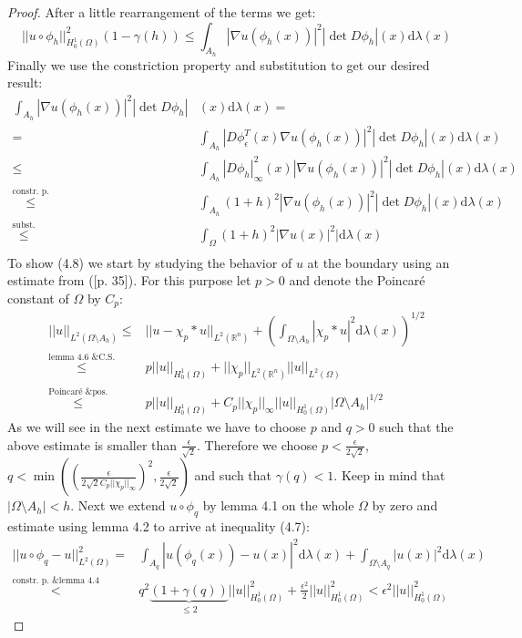 \documentclass[11pt,a4paper,leqno]{report}
\numberwithin{equation}{chapter}
\begin{document}
\begin{proof}
After a little rearrangement of the terms we get:
\begin{equation*}||u\circ\phi_h||_{H^1_0(\Omega)}^2(1-\gamma(h))\leq\int_{A_h}|\nabla u(\phi_h(x))|^2|\det D\phi_h|(x)\mathrm{d}\lambda(x)\end{equation*}
Finally we use the constriction property and substitution to get our desired result:
\begin{align*}\int_{A_h}|\nabla u(\phi_h(x))|^2|\det D\phi_h|&(x)\mathrm{d}\lambda(x)=\\
=&\int_{A_h} |D\phi_{\epsilon}^T(x) \nabla u(\phi_h(x))|^2|\det D\phi_h|(x)\mathrm{d}\lambda(x)\\
\leq&\int_{A_h} |D\phi_h|_\infty^2(x)|\nabla u(\phi_h(x))|^2|\det D\phi_h|(x)\mathrm{d}\lambda(x)\\
\overset{\text{constr. p.}}{\leq}&\int_{A_h} (1+h)^2|\nabla u(\phi_h(x))|^2|\det D\phi_h|(x)\mathrm{d}\lambda(x)\\
\overset{\text{subst.}}{\leq}&\int_\Omega (1+h)^2|\nabla u(x)|^2|\mathrm{d}\lambda(x)\\
\end{align*}
To show (4.8) we start by studying the behavior of $u$ at the boundary using an estimate from (\cite{Haslinger}[p. 35]). For this purpose let $p>0$ and denote the Poincar\'{e} constant of $\Omega$ by $C_p$:
\begin{align*}||u||_{L^2(\Omega\setminus A_h)}\leq &||u-\chi_p*u||_{L^2(\mathbb{R}^n)} +(\int_{\Omega\setminus A_h} |\chi_p*u|^2\mathrm{d}\lambda(x))^{1/2}\\
\overset{\text{lemma 4.6 \& C.S.}}{\leq}& p||u||_{H^1_0(\Omega)} + ||\chi_p||_{L^2(\mathbb{R}^n)}||u||_{L^2(\Omega)}\\
\overset{\text{Poincar\'{e} \& pos.}}{\leq}& p||u||_{H^1_0(\Omega)} + C_p||\chi_p||_{\infty}||u||_{H^1_0(\Omega)}|\Omega\setminus A_h|^{1/2}
\end{align*}
As we will see in the next estimate we have to choose $p$ and $q>0$ such that the above estimate is smaller than $\frac{\epsilon}{\sqrt{2}}$. Therefore we choose $p<\frac{\epsilon}{2\sqrt{2}}$, $q<\min((\frac{\epsilon}{2\sqrt{2}C_p||\chi_p||_\infty})^2,\frac{\epsilon}{2\sqrt{2}})$ and such that $\gamma(q)<1$. Keep in mind that $|\Omega\setminus A_h|<h$. Next we extend $u\circ\phi_q$ by lemma 4.1 on the whole $\Omega$ by zero and estimate using lemma 4.2 to arrive at inequality (4.7):%
\begin{align*}||u\circ\phi_q-u||_{L^2(\Omega)}^2=&\int_{A_q} |u(\phi_q(x))-u(x)|^2\mathrm{d}\lambda(x) + \int_{\Omega\setminus A_q} |u(x)|^2\mathrm{d}\lambda(x)\\
\overset{\text{constr. p. \& lemma 4.4}}{<} &q^2\underset{\leq 2}{\underbrace{(1+\gamma(q))}}||u||_{H^1_0(\Omega)}^2 + \frac{\epsilon^2}{2}||u||_{H^1_0(\Omega)}^2<\epsilon^2||u||_{H^1_0(\Omega)}^2
\end{align*}
\end{proof}
\end{document}
